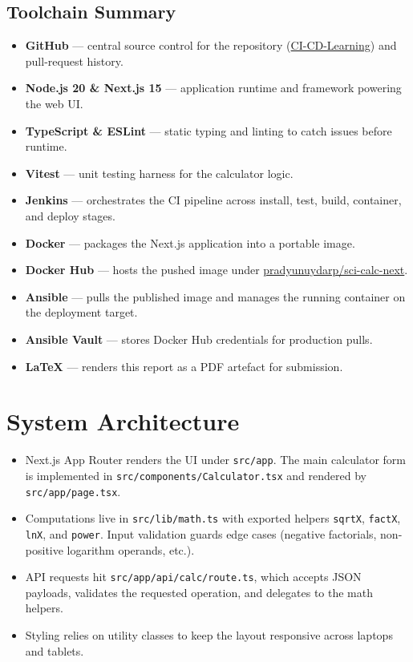 \documentclass[12pt]{article}
\begin{document}
\subsection*{Toolchain Summary}
\begin{itemize}[leftmargin=*]
  \item \textbf{GitHub} --- central source control for the repository (\href{https://github.com/pradyunuydarp/CI-CD-Learning}{CI-CD-Learning}) and pull-request history.
  \item \textbf{Node.js 20 \& Next.js 15} --- application runtime and framework powering the web UI.
  \item \textbf{TypeScript \& ESLint} --- static typing and linting to catch issues before runtime.
  \item \textbf{Vitest} --- unit testing harness for the calculator logic.
  \item \textbf{Jenkins} --- orchestrates the CI pipeline across install, test, build, container, and deploy stages.
  \item \textbf{Docker} --- packages the Next.js application into a portable image.
  \item \textbf{Docker Hub} --- hosts the pushed image under \href{https://hub.docker.com/r/pradyunuydarp/sci-calc-next}{pradyunuydarp/sci-calc-next}.
  \item \textbf{Ansible} --- pulls the published image and manages the running container on the deployment target.
  \item \textbf{Ansible Vault} --- stores Docker Hub credentials for production pulls.
  \item \textbf{LaTeX} --- renders this report as a PDF artefact for submission.
\end{itemize}

\section{System Architecture}
\begin{itemize}[leftmargin=*]
  \item Next.js App Router renders the UI under \texttt{src/app}. The main calculator form is implemented in \texttt{src/components/Calculator.tsx} and rendered by \texttt{src/app/page.tsx}.
  \item Computations live in \texttt{src/lib/math.ts} with exported helpers \texttt{sqrtX}, \texttt{factX}, \texttt{lnX}, and \texttt{power}. Input validation guards edge cases (negative factorials, non-positive logarithm operands, etc.).
  \item API requests hit \texttt{src/app/api/calc/route.ts}, which accepts JSON payloads, validates the requested operation, and delegates to the math helpers.
  \item Styling relies on utility classes to keep the layout responsive across laptops and tablets.
\end{itemize}
\end{document}
